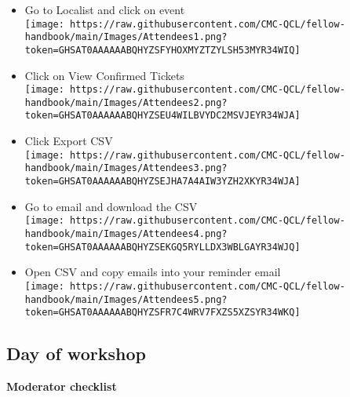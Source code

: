 \documentclass[
]{book}
\begin{document}
\begin{itemize}
\item
  Go to Localist and click on event\\
  \texttt{[image: https://raw.githubusercontent.com/CMC-QCL/fellow-handbook/main/Images/Attendees1.png?token=GHSAT0AAAAAABQHYZSFYHOXMYZTZYLSH53MYR34WIQ]}
\item
  Click on View Confirmed Tickets\\
  \texttt{[image: https://raw.githubusercontent.com/CMC-QCL/fellow-handbook/main/Images/Attendees2.png?token=GHSAT0AAAAAABQHYZSEU4WILBVYDC2MSVJEYR34WJA]}
\item
  Click Export CSV\\
  \texttt{[image: https://raw.githubusercontent.com/CMC-QCL/fellow-handbook/main/Images/Attendees3.png?token=GHSAT0AAAAAABQHYZSEJHA7A4AIW3YZH2XKYR34WJA]}
\item
  Go to email and download the CSV\\
  \texttt{[image: https://raw.githubusercontent.com/CMC-QCL/fellow-handbook/main/Images/Attendees4.png?token=GHSAT0AAAAAABQHYZSEKGQ5RYLLDX3WBLGAYR34WJQ]}
\item
  Open CSV and copy emails into your reminder email\\
  \texttt{[image: https://raw.githubusercontent.com/CMC-QCL/fellow-handbook/main/Images/Attendees5.png?token=GHSAT0AAAAAABQHYZSFR7C4WRV7FXZS5XZSYR34WKQ]}
\end{itemize}

\hypertarget{day-of-workshop}{%
\subsection{Day of workshop}\label{day-of-workshop}}

\textbf{Moderator checklist}
\end{document}
